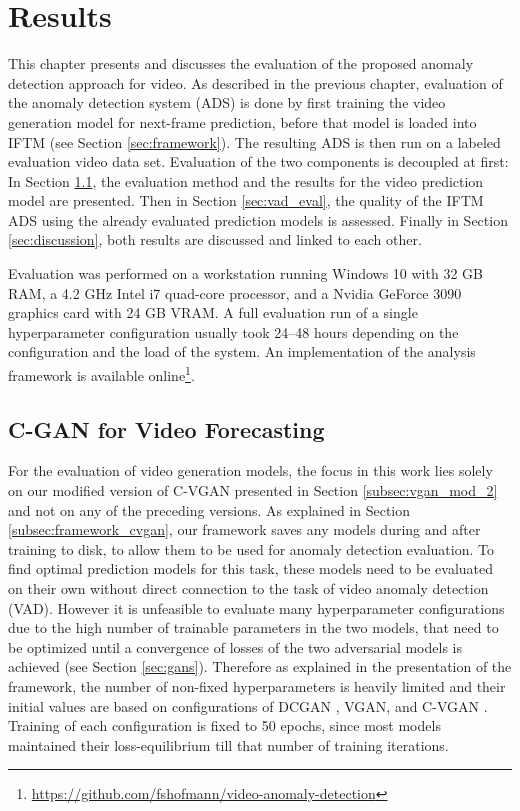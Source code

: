 \chapter{Results} \label{chap:results} %

This chapter presents and discusses the evaluation of the proposed anomaly detection approach for video. As described in the previous chapter, evaluation of the anomaly detection system (ADS) is done by first training the video generation model for next-frame prediction, before that model is loaded into IFTM (see Section \ref{sec:framework}). The resulting ADS is then run on a labeled evaluation video data set. Evaluation of the two components is decoupled at first: In Section \ref{sec:cvgan_eval}, the evaluation method and the results for the video prediction model are presented. Then in Section \ref{sec:vad_eval}, the quality of the IFTM ADS using the already evaluated prediction models is assessed. Finally in Section \ref{sec:discussion}, both results are discussed and linked to each other.

Evaluation was performed on a workstation running Windows 10 with 32 GB RAM, a 4.2 GHz Intel i7 quad-core processor, and a Nvidia GeForce 3090 graphics card with 24 GB VRAM. A full evaluation run of a single hyperparameter configuration usually took 24--48 hours depending on the configuration and the load of the system. An implementation of the analysis framework is available online\footnote{\url{https://github.com/fshofmann/video-anomaly-detection}}.



\section{C-GAN for Video Forecasting} \label{sec:cvgan_eval}

For the evaluation of video generation models, the focus in this work lies solely on our modified version of C-VGAN presented in Section \ref{subsec:vgan_mod_2} and not on any of the preceding versions. As explained in Section \ref{subsec:framework_cvgan}, our framework saves any models during and after training to disk, to allow them to be used for anomaly detection evaluation. To find optimal prediction models for this task, these models need to be evaluated on their own without direct connection to the task of video anomaly detection (VAD). However it is unfeasible to evaluate many hyperparameter configurations due to the high number of trainable parameters in the two models, that need to be optimized until a convergence of losses of the two adversarial models is achieved (see Section \ref{sec:gans}). Therefore as explained in the presentation of the framework, the number of non-fixed hyperparameters is heavily limited and their initial values are based on configurations of DCGAN \cite{radford2015unsupervised}, VGAN, and C-VGAN \cite{vondrick2016generating}. Training of each configuration is fixed to 50 epochs, since most models maintained their loss-equilibrium till that number of training iterations.

